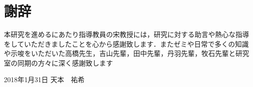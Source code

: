 \documentclass[12pt]{optlab-bachelor}
\def\氏名{天本　祐希}
\begin{document}

\chapter*{謝辞}
本研究を進めるにあたり指導教員の宋教授には，研究に対する助言や熱心な指導をしていただきましたことを心から感謝致します．またゼミや日常で多くの知識や示唆をいただいた高橋先生，吉山先輩，田中先輩，丹羽先輩，牧石先輩と研究室の同期の方々に深く感謝致します

\begin{flushright}
  2018年1月31日 \氏名
\end{flushright}
\endmatter
\end{document}
